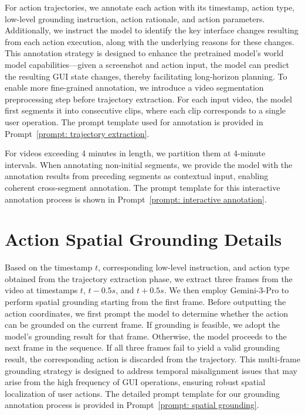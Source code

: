 \documentclass{article}
\theoremstyle{plain}
\theoremstyle{definition}
\theoremstyle{remark}
\begin{document}
For action trajectories, we annotate each action with its timestamp, action type, low-level grounding instruction, action rationale, and action parameters. Additionally, we instruct the model to identify the key interface changes resulting from each action execution, along with the underlying reasons for these changes. This annotation strategy is designed to enhance the pretrained model's world model capabilities—given a screenshot and action input, the model can predict the resulting GUI state changes, thereby facilitating long-horizon planning. To enable more fine-grained annotation, we introduce a video segmentation preprocessing step before trajectory extraction. For each input video, the model first segments it into consecutive clips, where each clip corresponds to a single user operation. The prompt template used for annotation is provided in Prompt~\ref{prompt: trajectory extraction}.

For videos exceeding 4 minutes in length, we partition them at 4-minute intervals. When annotating non-initial segments, we provide the model with the annotation results from preceding segments as contextual input, enabling coherent cross-segment annotation. The prompt template for this interactive annotation process is shown in Prompt~\ref{prompt: interactive annotation}.

\section{Action Spatial Grounding Details}
\label{sec: action grounding}
Based on the timestamp $t$, corresponding low-level instruction, and action type obtained from the trajectory extraction phase, we extract three frames from the video at timestamps $t$, $t-0.5s$, and $t+0.5s$. We then employ Gemini-3-Pro to perform spatial grounding starting from the first frame.
Before outputting the action coordinates, we first prompt the model to determine whether the action can be grounded on the current frame. If grounding is feasible, we adopt the model's grounding result for that frame. Otherwise, the model proceeds to the next frame in the sequence. If all three frames fail to yield a valid grounding result, the corresponding action is discarded from the trajectory.
This multi-frame grounding strategy is designed to address temporal misalignment issues that may arise from the high frequency of GUI operations, ensuring robust spatial localization of user actions. The detailed prompt template for our grounding annotation process is provided in Prompt~\ref{prompt: spatial grounding}.
\end{document}
